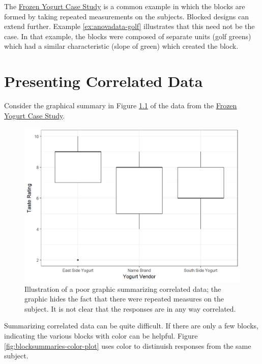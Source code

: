 \documentclass[]{book}
\theoremstyle{plain}
\theoremstyle{mydefn}
\theoremstyle{myexmpl}
\theoremstyle{remark}
\begin{document}
The \protect\hyperlink{CaseYogurt}{Frozen Yogurt Case Study} is a common
example in which the blocks are formed by taking repeated measurements
on the subjects. Blocked designs can extend further. Example
\ref{ex:anovadata-golf} illustrates that this need not be the case. In
that example, the blocks were composed of separate units (golf greens)
which had a similar characteristic (slope of green) which created the
block.

\chapter{Presenting Correlated Data}\label{Blocksummaries}

Consider the graphical summary in Figure
\ref{fig:blocksummaries-bad-plot} of the data from the
\protect\hyperlink{CaseYogurt}{Frozen Yogurt Case Study}.

\begin{figure}

{\centering \includegraphics[width=0.8\linewidth]{./Images/blocksummaries-bad-plot-1} 

}

\caption{Illustration of a poor graphic summarizing correlated data; the graphic hides the fact that there were repeated measures on the subject.  It is not clear that the responses are in any way correlated.}\label{fig:blocksummaries-bad-plot}
\end{figure}

Summarizing correlated data can be quite difficult. If there are only a
few blocks, indicating the various blocks with color can be helpful.
Figure \ref{fig:blocksummaries-color-plot} uses color to distinuish
responses from the same subject.
\end{document}
